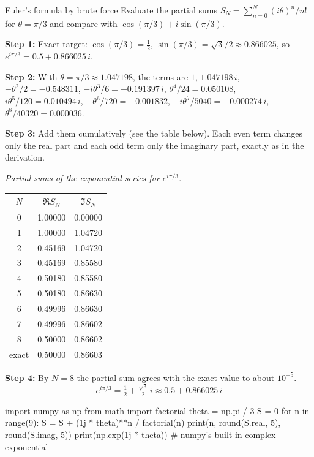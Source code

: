\begin{sample}{Euler's formula by brute force}
Evaluate the partial sums $S_N=\sum_{n=0}^{N}(i\theta)^n/n!$ for $\theta=\pi/3$ and compare with $\cos(\pi/3)+i\sin(\pi/3)$.

\textbf{Step 1:} Exact target: $\cos(\pi/3)=\tfrac12$, $\sin(\pi/3)=\sqrt3/2\approx0.866025$, so $e^{i\pi/3}=0.5+0.866025\,i$.

\textbf{Step 2:} With $\theta=\pi/3\approx1.047198$, the terms are $1$, $1.047198\,i$, $-\theta^2/2=-0.548311$, $-i\theta^3/6=-0.191397\,i$, $\theta^4/24=0.050108$, $i\theta^5/120=0.010494\,i$, $-\theta^6/720=-0.001832$, $-i\theta^7/5040=-0.000274\,i$, $\theta^8/40320=0.000036$.

\textbf{Step 3:} Add them cumulatively (see the table below). Each even term changes only the real part and each odd term only the imaginary part, exactly as in the derivation.

\begin{center}
\textit{Partial sums of the exponential series for $e^{i\pi/3}$.}\\[4pt]
\begin{tabular}{ccc}
\toprule
$N$ & $\Re S_N$ & $\Im S_N$\\
\midrule
0 & 1.00000 & 0.00000\\
1 & 1.00000 & 1.04720\\
2 & 0.45169 & 1.04720\\
3 & 0.45169 & 0.85580\\
4 & 0.50180 & 0.85580\\
5 & 0.50180 & 0.86630\\
6 & 0.49996 & 0.86630\\
7 & 0.49996 & 0.86602\\
8 & 0.50000 & 0.86602\\
\midrule
exact & 0.50000 & 0.86603\\
\bottomrule
\end{tabular}
\end{center}

\textbf{Step 4:} By $N=8$ the partial sum agrees with the exact value to about $10^{-5}$.
\[
\boxed{e^{i\pi/3}=\tfrac12+\tfrac{\sqrt3}{2}\,i\approx0.5+0.866025\,i}
\]
\end{sample}

\begin{pycode}
import numpy as np
from math import factorial
theta = np.pi / 3
S = 0
for n in range(9):
    S = S + (1j * theta)**n / factorial(n)
    print(n, round(S.real, 5), round(S.imag, 5))
print(np.exp(1j * theta))   # numpy's built-in complex exponential
\end{pycode}

